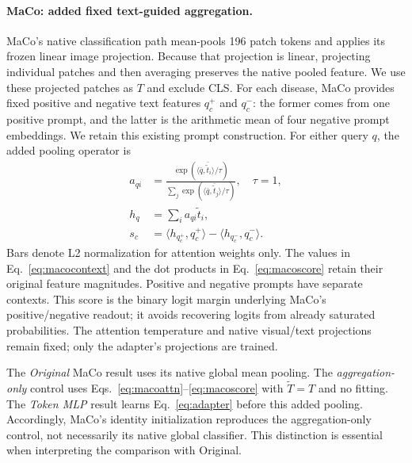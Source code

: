\documentclass[10pt,twocolumn,letterpaper]{article}
\begin{document}
\paragraph{MaCo: added fixed text-guided aggregation.}
MaCo's native classification path mean-pools 196 patch tokens and applies its frozen linear image projection. Because that projection is linear, projecting individual patches and then averaging preserves the native pooled feature. We use these projected patches as $T$ and exclude CLS. For each disease, MaCo provides fixed positive and negative text features $q_c^+$ and $q_c^-$: the former comes from one positive prompt, and the latter is the arithmetic mean of four negative prompt embeddings. We retain this existing prompt construction. For either query $q$, the added pooling operator is
\begin{align}
a_{qi}&=\frac{\exp\!\left(\langle\bar q,\bar{\tilde t}_i\rangle/\tau\right)}
{\sum_j\exp\!\left(\langle\bar q,\bar{\tilde t}_j\rangle/\tau\right)},\quad \tau=1,\label{eq:macoattn}\\
h_q&=\sum_i a_{qi}\tilde t_i,\label{eq:macocontext}\\
s_c&=\langle h_{q_c^+},q_c^+\rangle-\langle h_{q_c^-},q_c^-\rangle.
\label{eq:macoscore}
\end{align}
Bars denote L2 normalization for attention weights only. The values in Eq.~\eqref{eq:macocontext} and the dot products in Eq.~\eqref{eq:macoscore} retain their original feature magnitudes. Positive and negative prompts have separate contexts. This score is the binary logit margin underlying MaCo's positive/negative readout; it avoids recovering logits from already saturated probabilities. The attention temperature and native visual/text projections remain fixed; only the adapter's projections are trained.

The \emph{Original} MaCo result uses its native global mean pooling. The \emph{aggregation-only} control uses Eqs.~\eqref{eq:macoattn}--\eqref{eq:macoscore} with $\tilde T=T$ and no fitting. The \emph{Token MLP} result learns Eq.~\eqref{eq:adapter} before this added pooling. Accordingly, MaCo's identity initialization reproduces the aggregation-only control, not necessarily its native global classifier. This distinction is essential when interpreting the comparison with Original.
\end{document}
